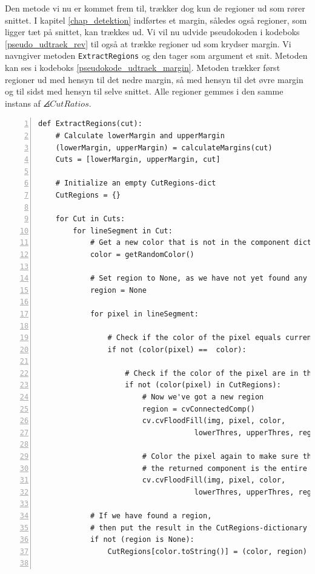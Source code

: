 {
Den metode vi nu er kommet frem til, trækker dog kun de regioner ud som
rører snittet. I kapitel \ref{chap_detektion} indførtes et margin,
således også regioner, som ligger tæt på snittet, kan trækkes ud. Vi vil
nu udvide pseudokoden i kodeboks \ref{pseudo_udtraek_rev} til også at
trække regioner ud som krydser margin. Vi navngiver metoden
\texttt{ExtractRegions} og den tager som argument et snit. Metoden kan
ses i kodeboks \ref{pseudokode_udtraek_margin}. Metoden trækker først
regioner ud med hensyn til det nedre margin, så med hensyn til det øvre
margin og til sidst med hensyn til selve snittet. Alle regioner gemmes i
den samme instans af $\angles{CutRatios}$.

\begin{lstlisting}[caption={Pseudokode til udtrækning af regioner med
    margin.},captionpos=b,label={pseudo_udtraek_margin},numbers=left,
    frame=single, breaklines=false, float=h]
def ExtractRegions(cut):
    # Calculate lowerMargin and upperMargin
    (lowerMargin, upperMargin) = calculateMargins(cut)
    Cuts = [lowerMargin, upperMargin, cut]

    # Initialize an empty CutRegions-dict
    CutRegions = {}

    for Cut in Cuts:
        for lineSegment in Cut:
            # Get a new color that is not in the component dictionary
            color = getRandomColor()

            # Set region to None, as we have not yet found any
            region = None

            for pixel in lineSegment:

                # Check if the color of the pixel equals current color
                if not (color(pixel) ==  color):

                    # Check if the color of the pixel are in the saved regions
                    if not (color(pixel) in CutRegions):
                        # Now we've got a new region
                        region = cvConnectedComp()
                        cv.cvFloodFill(img, pixel, color,
                                    lowerThres, upperThres, region)

                        # Color the pixel again to make sure that
                        # the returned component is the entire region
                        cv.cvFloodFill(img, pixel, color,
                                    lowerThres, upperThres, region)

            # If we have found a region,
            # then put the result in the CutRegions-dictionary
            if not (region is None):
                CutRegions[color.toString()] = (color, region)


\end{lstlisting}}
